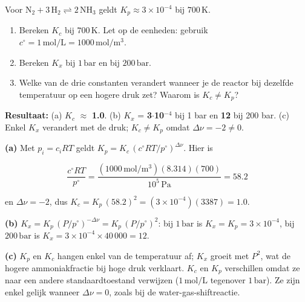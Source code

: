 \begin{oefening}
Voor \(\mathrm{N_2 + 3\,H_2 \rightleftharpoons 2\,NH_3}\) geldt \(K_p \approx 3\times10^{-4}\) bij \(700\,\mathrm{K}\).

\begin{enumerate}
\item[(a)]
  Bereken \(K_c\) bij \(700\,\mathrm{K}\). Let op de eenheden: gebruik \(c^\circ = 1\,\mathrm{mol/L} = 1000\,\mathrm{mol/m^3}\).
\item[(b)]
  Bereken \(K_x\) bij \(1\,\mathrm{bar}\) en bij \(200\,\mathrm{bar}\).
\item[(c)]
  Welke van de drie constanten verandert wanneer je de reactor bij dezelfde temperatuur op een hogere druk zet? Waarom is \(K_c \neq K_p\)?
\end{enumerate}
\end{oefening}
\begin{oplossing}
\textbf{Resultaat:} (a) \(K_c\) \ensuremath{\approx{}} \textbf{1.0}. (b) \(K_x\) = \textbf{3\ensuremath{\cdot{}}10\ensuremath{^{-4}}} bij 1 bar en \textbf{12} bij 200 bar. (c) Enkel \textbf{\(K_x\)} verandert met de druk; \(K_c \neq K_p\) omdat \(\Delta\nu = -2 \neq 0\).

\textbf{(a)} Met \(p_i = c_i RT\) geldt \(K_p = K_c\,(c^\circ RT/p^\circ)^{\Delta\nu}\). Hier is

\[
\frac{c^\circ RT}{p^\circ} = \frac{(1000\,\mathrm{mol/m^3})(8.314)(700)}{10^5\,\mathrm{Pa}} = 58.2
\]

en \(\Delta\nu = -2\), dus \(K_c = K_p\,(58.2)^{2} = (3\times10^{-4})(3387) = 1.0\).

\textbf{(b)} \(K_x = K_p\,(P/p^\circ)^{-\Delta\nu} = K_p\,(P/p^\circ)^{2}\): bij \(1\,\mathrm{bar}\) is \(K_x = K_p = 3\times10^{-4}\), bij \(200\,\mathrm{bar}\) is \(K_x = 3\times10^{-4} \times 40\,000 = 12\).

\textbf{(c)} \(K_p\) en \(K_c\) hangen enkel van de temperatuur af; \(K_x\) groeit met \(P^2\), wat de hogere ammoniakfractie bij hoge druk verklaart. \(K_c\) en \(K_p\) verschillen omdat ze naar een andere standaardtoestand verwijzen (\(1\,\mathrm{mol/L}\) tegenover \(1\,\mathrm{bar}\)). Ze zijn enkel gelijk wanneer \(\Delta\nu = 0\), zoals bij de water-gas-shiftreactie.
\end{oplossing}

